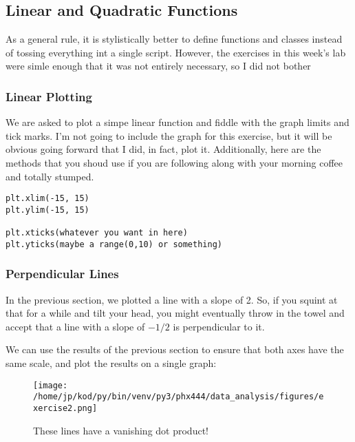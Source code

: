 \documentclass{article}
\begin{document}
\subsection{Linear and Quadratic Functions}
As a general rule, it is stylistically better to define functions and classes
instead of tossing everything int a single script. However, the exercises in
this week's lab were simle enough that it was not entirely necessary, so I did
not bother


\subsubsection{Linear Plotting}

We are asked to plot a simpe linear function and fiddle with the
graph limits and tick marks. I'm not going to include the graph for
this exercise, but it will be obvious going forward that I did, in
fact, plot it. Additionally, here are the methods that you shoud use if
you are following along with your morning coffee and totally stumped.

\begin{center}
\begin{minipage}[t]{.80\textwidth}
\begin{lstlisting}[caption=Limits \& Ticks, frame=tlrb]
plt.xlim(-15, 15)
plt.ylim(-15, 15)

plt.xticks(whatever you want in here)
plt.yticks(maybe a range(0,10) or something)
\end{lstlisting}
\end{minipage}
\end{center}

\subsubsection{Perpendicular Lines}
In the previous section, we plotted a line with a slope of 2. So, if you
squint at that for a while and tilt your head, you might eventually throw in the
towel and accept that a line with a slope of $- 1/2$ is perpendicular to it.

We can use the results of the previous section to ensure that both axes have
the same scale, and plot the results on a single graph:
\begin{figure}[H]
        \begin{center}
        \texttt{[image: /home/jp/kod/py/bin/venv/py3/phx444/data\_analysis/figures/exercise2.png]}
        \caption{These lines have a vanishing dot product!}
        \label{fig:fig_5}
        \end{center}
\end{figure}
\end{document}
